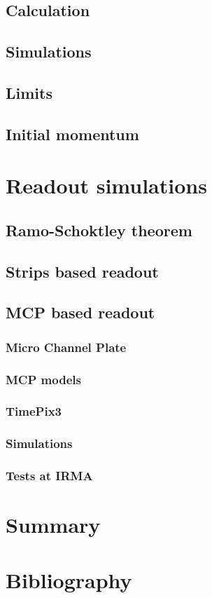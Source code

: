 \begin{refsection}
	\subsection{Calculation}
	
	\subsection{Simulations}
	\subsection{Limits}
	\subsection{Initial momentum}
	
	\section{Readout simulations}
	\subsection{Ramo-Schoktley theorem}
	\cite[]{Ramo_1939}\cite[]{Shockley_1938}\cite[]{Cavalleri1971}\cite[]{Jen1941}
	\subsection{Strips based readout}
	\subsection{MCP based readout}
	\subsubsection{Micro Channel Plate}
	\subsubsection{MCP models}
	\subsubsection{TimePix3}
	\subsubsection{Simulations}
	\subsubsection{Tests at IRMA}

	\section{Summary}
	\label{ch3:Summary}

	\cleardoublepage
	\section{Bibliography}
	\label{ch3:bib}
	\printbibliography[heading=subbibliography]
\end{refsection}